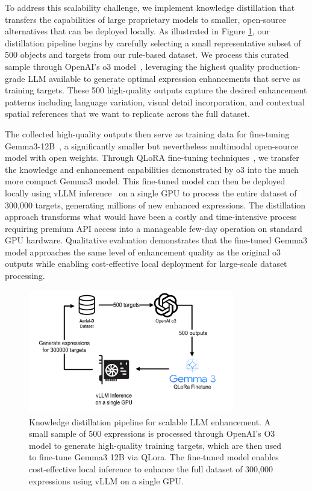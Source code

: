 To address this scalability challenge, we implement knowledge distillation that transfers the capabilities of large proprietary models to smaller, open-source alternatives that can be deployed locally. As illustrated in Figure \ref{fig:llm_distillation}, our distillation pipeline begins by carefully selecting a small representative subset of 500 objects and targets from our rule-based dataset. We process this curated sample through OpenAI's o3 model~\cite{o3}, leveraging the highest quality production-grade LLM available to generate optimal expression enhancements that serve as training targets. These 500 high-quality outputs capture the desired enhancement patterns including language variation, visual detail incorporation, and contextual spatial references that we want to replicate across the full dataset.

The collected high-quality outputs then serve as training data for fine-tuning Gemma3-12B~\cite{gemma3}, a significantly smaller but nevertheless multimodal open-source model with open weights. Through QLoRA fine-tuning techniques~\cite{qlora}, we transfer the knowledge and enhancement capabilities demonstrated by o3 into the much more compact Gemma3 model. This fine-tuned model can then be deployed locally using vLLM inference~\cite{vllm} on a single GPU to process the entire dataset of 300,000 targets, generating millions of new enhanced expressions. The distillation approach transforms what would have been a costly and time-intensive process requiring premium API access into a manageable few-day operation on standard GPU hardware. Qualitative evaluation demonstrates that the fine-tuned Gemma3 model approaches the same level of enhancement quality as the original o3 outputs while enabling cost-effective local deployment for large-scale dataset processing.

\begin{figure}[H]
\centering
\includegraphics[width=0.8\textwidth]{Images/distillation.png}
\caption{Knowledge distillation pipeline for scalable LLM enhancement. A small sample of 500 expressions is processed through OpenAI's O3 model to generate high-quality training targets, which are then used to fine-tune Gemma3 12B via QLora. The fine-tuned model enables cost-effective local inference to enhance the full dataset of 300,000 expressions using vLLM on a single GPU.}
\label{fig:llm_distillation}
\end{figure}


